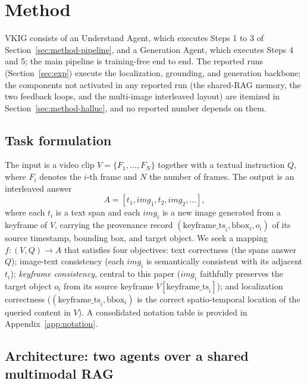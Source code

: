 \documentclass[10pt]{article}
\begin{document}
\section{Method}\label{sec:method}

VKIG consists of an Understand Agent, which executes Steps 1 to 3 of Section~\ref{sec:method-pipeline}, and a Generation Agent, which executes Steps 4 and 5; the main pipeline is training-free end to end. The reported runs (Section~\ref{sec:exp}) execute the localization, grounding, and generation backbone; the components not activated in any reported run (the shared-RAG memory, the two feedback loops, and the multi-image interleaved layout) are itemized in Section~\ref{sec:method-halluc}, and no reported number depends on them.

\subsection{Task formulation}\label{sec:method-task}

The input is a video clip $V = \{F_1, \ldots, F_N\}$ together with a textual instruction $Q$, where $F_i$ denotes the $i$-th frame and $N$ the number of frames. The output is an interleaved answer
\begin{equation}
A = [t_1, img_1, t_2, img_2, \ldots],
\end{equation}
where each $t_i$ is a text span and each $img_i$ is a new image generated from a keyframe of $V$, carrying the provenance record $(\text{keyframe\_ts}_i, \text{bbox}_i, o_i)$ of its source timestamp, bounding box, and target object. We seek a mapping $f: (V, Q) \rightarrow A$ that satisfies four objectives: text correctness (the spans answer $Q$); image-text consistency (each $img_i$ is semantically consistent with its adjacent $t_i$); \emph{keyframe consistency}, central to this paper ($img_i$ faithfully preserves the target object $o_i$ from its source keyframe $V[\text{keyframe\_ts}_i]$); and localization correctness ($(\text{keyframe\_ts}_i, \text{bbox}_i)$ is the correct spatio-temporal location of the queried content in $V$). A consolidated notation table is provided in Appendix~\ref{app:notation}.

\subsection{Architecture: two agents over a shared multimodal RAG}\label{sec:method-arch}
\end{document}
